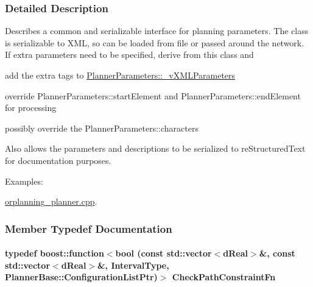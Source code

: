 \subsubsection{Detailed Description}
Describes a common and serializable interface for planning parameters. The class is serializable to XML, so can be loaded from file or passed around the network. If extra parameters need to be specified, derive from this class and
\begin{DoxyItemize}
\item add the extra tags to \hyperlink{classOpenRAVE_1_1PlannerBase_1_1PlannerParameters_a6bdbb89d87824ee05004fbd5ecd4994b}{PlannerParameters::\_\-vXMLParameters}
\item override PlannerParameters::startElement and PlannerParameters::endElement for processing
\item possibly override the PlannerParameters::characters
\end{DoxyItemize}

Also allows the parameters and descriptions to be serialized to reStructuredText for documentation purposes. \begin{Desc}
\item[Examples: ]\par


\hyperlink{orplanning__planner_8cpp-example}{orplanning\_\-planner.cpp}.

\end{Desc}


\subsubsection{Member Typedef Documentation}
\hypertarget{classOpenRAVE_1_1PlannerBase_1_1PlannerParameters_aca89abb7137aa4f3aa98065ce10f7f6a}{
\paragraph[{CheckPathConstraintFn}]{\setlength{\rightskip}{0pt plus 5cm}typedef boost::function$<$bool (const std::vector$<$dReal$>$\&, const std::vector$<$dReal$>$\&, {\bf IntervalType}, PlannerBase::ConfigurationListPtr)$>$ {\bf CheckPathConstraintFn}}\hfill}
\label{classOpenRAVE_1_1PlannerBase_1_1PlannerParameters_aca89abb7137aa4f3aa98065ce10f7f6a}



